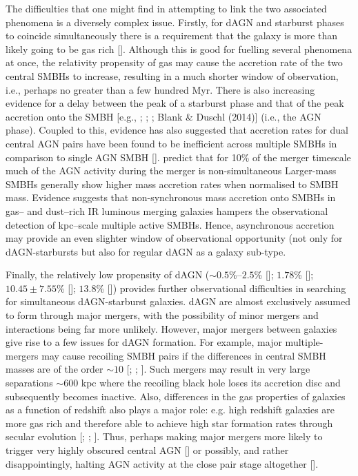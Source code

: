 The difficulties that one might find in attempting to link the two associated phenomena is a diversely complex issue. Firstly, for dAGN and starburst phases to coincide simultaneously there is a requirement that the galaxy is more than likely going to be gas rich [\cite{Hopkins_2012}]. Although this is good for fuelling several phenomena at once, the relativity propensity of gas may cause the accretion rate of the two central SMBHs to increase, resulting in a much shorter window of observation, i.e., perhaps no greater than a few hundred Myr. There is also increasing evidence for a delay between the peak of a starburst phase and that of the peak accretion onto the SMBH [e.g., \cite{Di_Matteo_2005}; \cite{Wild_2010}; \cite{Hopkins_2012}; Blank \& Duschl (2014)] (i.e., the AGN phase). Coupled to this, evidence has also  suggested that accretion rates for dual central AGN pairs have been found to be inefficient across multiple SMBHs in comparison to single AGN SMBH [\cite{Dotti_Bellovary_Callegari_2012}]. \cite{Dotti_Bellovary_Callegari_2012} predict that for 10\% of the merger timescale much of the AGN activity during the merger is non-simultaneous  Larger-mass SMBHs generally show higher mass accretion rates when normalised to SMBH mass. Evidence suggests that non-synchronous mass accretion onto SMBHs in gas-- and dust--rich IR luminous merging galaxies hampers the observational detection of kpc--scale multiple active SMBHs. Hence, asynchronous accretion may provide an even slighter window of observational opportunity (not only for dAGN-starbursts but also for regular dAGN as a galaxy sub-type.

Finally, the relatively low propensity of dAGN ($\sim{0.5}$\%--$2.5$\% [\cite{Shen_Liu_Greene_Strauss_2011}]; $1.78$\% [\cite{Ge_Hu_Wang_Bai_Zhang_2012}]; $10.45{\pm}7.55$\% [\cite{rford_Schluns_Greene_Cool_2013}]; $13.8$\% [\cite{2014ApJ...780..106I}]) provides further observational difficulties in searching for simultaneous dAGN-starburst galaxies. dAGN are almost exclusively assumed to form through major mergers, with the possibility of minor mergers and interactions being far more unlikely. However, major mergers between galaxies give rise to a few issues for dAGN formation. For example, major multiple-mergers may cause recoiling SMBH pairs if the differences in central SMBH masses are of the order $\sim{10}$ [\cite{onning_Shields_Salviander_2007}; \cite{Gualandris_Merritt_2008}; \cite{Blecha_Civano_Elvis_Loeb_2013}]. Such mergers may result in very large separations $\sim{600}$ kpc where the recoiling black hole loses its accretion disc and subsequently becomes inactive. Also, differences in the gas properties of galaxies as a function of redshift also plays a major role: e.g. high redshift galaxies are more gas rich and therefore able to achieve high star formation rates through secular evolution [\cite{Hicks_Friedrich_Sternberg_2007}; \cite{2010ApJ...715..202H}; \cite{Draper_Ballantyne_2012}]. Thus, perhaps making major mergers more likely to trigger very highly obscured central AGN [\cite{2009ApJ...698L.116P}] or possibly, and rather disappointingly, halting AGN activity at the close pair stage altogether [\cite{Scott_Kaviraj_2013}].


